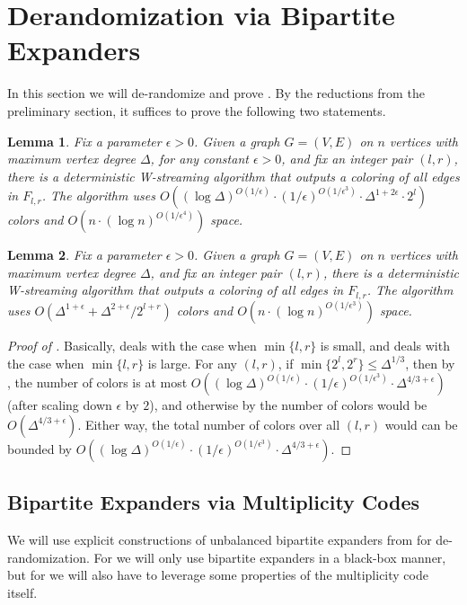\documentclass[11pt,a4paper]{article}
\newtheorem{lemma}{Lemma}[section]
\newcommand{\brac}[1]{\left(#1\right)}
\begin{document}
 \section{Derandomization via Bipartite Expanders}

In this section we will de-randomize  and prove . By the reductions from the preliminary section, it suffices to prove the following two statements.

\begin{lemma}\label{det-low}
	Fix a parameter $\epsilon > 0$. Given a graph $G = (V, E)$ on $n$ vertices with maximum vertex degree $\Delta$, for any constant $\epsilon > 0$, and fix an integer pair $(l, r)$, there is a deterministic W-streaming algorithm that outputs a coloring of all edges in $F_{l, r}$. The algorithm uses $O\brac{(\log\Delta)^{O(1 / \epsilon)}\cdot(1/\epsilon)^{O(1/\epsilon^3)}\cdot \Delta^{1+2\epsilon}\cdot 2^l}$ colors and $O\brac{n\cdot (\log n)^{O(1 / \epsilon^4)}}$ space.
\end{lemma}

\begin{lemma}\label{det-high}
	Fix a parameter $\epsilon > 0$. Given a graph $G = (V, E)$ on $n$ vertices with maximum vertex degree $\Delta$, and fix an integer pair $(l, r)$, there is a deterministic W-streaming algorithm that outputs a coloring of all edges in $F_{l, r}$. The algorithm uses $O\brac{\Delta^{1+\epsilon} + \Delta^{2+\epsilon} / 2^{l+r}}$ colors and $O\brac{n \cdot (\log n)^{{O(1/\epsilon^3)}}}$ space.
\end{lemma}

\begin{proof}[Proof of ]
	Basically,  deals with the case when $\min\{l, r\}$ is small, and  deals with the case when $\min\{l, r\}$ is large. For any $(l, r)$, if $\min\{2^l, 2^r\}\leq \Delta^{1/3}$, then by , the number of colors is at most $O\brac{(\log\Delta)^{O(1 / \epsilon)}\cdot(1/\epsilon)^{O(1/\epsilon^3)}\cdot \Delta^{4/3+\epsilon}}$ (after scaling down $\epsilon$ by $2$), and otherwise by  the number of colors would be $O\brac{\Delta^{4/3+\epsilon}}$. Either way, the total number of colors over all $(l, r)$ would can be bounded by $O\brac{(\log\Delta)^{O(1 / \epsilon)}\cdot(1/\epsilon)^{O(1/\epsilon^3)}\cdot \Delta^{4/3+\epsilon}}$.
\end{proof}

\subsection{Bipartite Expanders via Multiplicity Codes}
We will use explicit constructions of unbalanced bipartite expanders from \cite{kalev2022unbalanced} for de-randomization. For  we will only use bipartite expanders in a black-box manner, but for  we will also have to leverage some properties of the multiplicity code itself. 
\end{document}
